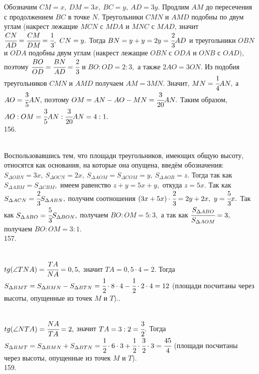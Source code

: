 Обозначим $CM=x,\ DM=3x,\ BC=y,\ AD=3y.$ Продлим $AM$ до пересечения с продолжением $BC$ в точке $N.$ Треугольники $CMN$ и $AMD$ подобны по двум углам (накрест лежащие  $MCN$ с $MDA$ и $MNC$ с $MAD$, значит $\cfrac{CN}{AD}=\cfrac{CM}{DM}=\cfrac{1}{3},\ CN=y.$ Тогда $BN=y+y=2y=\cfrac{2}{3}AD$ и треугольники $OBN$ и $ODA$ подобны двум углам (накрест лежащие $OBN$ с $ODA$ и $ONB$ с $OAD),$ поэтому $\cfrac{BO}{OD}=\cfrac{BN}{AD}=\cfrac{2}{3}$ и $BO:OD=2:3,$ а также $2AO=3ON.$ Из подобия треугольников $CMN$ и $AMD$ получаем $AM=3MN.$ Значит, $MN=\cfrac{1}{4}AN,$ а $AO=\cfrac{3}{5}AN,$ поэтому $OM=AN-AO-MN=\cfrac{3}{20}AN.$ Таким образом, $AO:OM=\cfrac{3}{5}AN:\cfrac{3}{20}AN=4:1.$\\
156. \begin{figure}[ht!]
\end{figure}\\
Воспользовавшись тем, что площади треугольников, имеющих общую высоту, относятся как основания, на которые она опущена, введём обозначения: $S_{\Delta OBN}=3x,\ S_{\Delta OCN}=2x,\ S_{\Delta AOM}=S_{\Delta COM}=y,\ S_{\Delta AOB}=z.$ Тогда так как $S_{\Delta ABM}=S_{\Delta CBM},$ имеем равенство $z+y=5x+y,$ откуда $z=5x.$ Так как $S_{\Delta ACN}=\cfrac{2}{3}S_{\Delta ABN},$ получим соотношения $(3x+5x)\cdot\cfrac{2}{3}=2y+2x,\ y=\cfrac{5}{3}x.$ Так как $S_{\Delta ABO}=\cfrac{5}{3}S_{\Delta BON},$ получаем $BO:OM=5:3,$ а так как $\cfrac{S_{\Delta ABO}}{S_{\Delta AOM}}=3,$ получаем $BO:OM=3:1.$\\
157. \begin{figure}[ht!]
\end{figure}\\
$tg(\angle TNA)=\cfrac{TA}{NA}=0,5,$ значит $TA=0,5\cdot4=2.$ Тогда $S_{\Delta BMT}=S_{\Delta BMN}-S_{\Delta BTN}=\cfrac{1}{2}\cdot8\cdot4-\cfrac{1}{2}\cdot2\cdot4=12$ (площади посчитаны через высоты, опущенные из точек $M$ и $T$).\newpage{}. \begin{figure}[ht!]
\end{figure}\\
$tg(\angle NTA)=\cfrac{NA}{TA}=2,$ значит $TA=3:2=\cfrac{3}{2}.$ Тогда $S_{\Delta BMT}=S_{\Delta BMN}+S_{\Delta BTN}=\cfrac{1}{2}\cdot6\cdot3+\cfrac{1}{2}\cdot\cfrac{3}{2}\cdot3=\cfrac{45}{4}$ (площади посчитаны через высоты, опущенные из точек $M$ и $T$).\\
159. \begin{figure}[ht!]
\end{figure}\\
